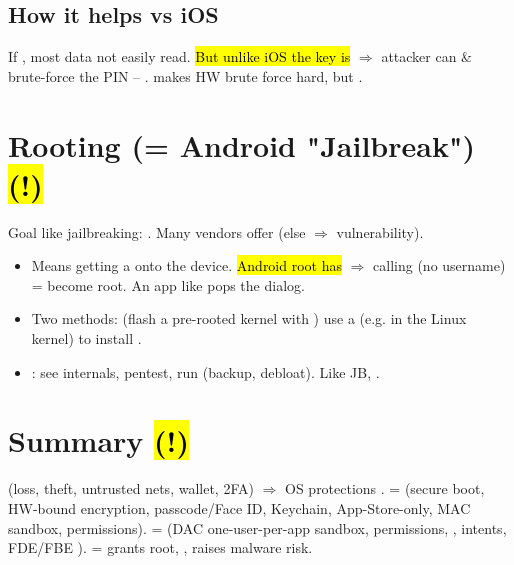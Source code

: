 \subsection{How it helps vs iOS}
If , most data not easily read. \hl{But unlike iOS the key is } $\Rightarrow$ attacker can  \& brute-force the PIN  -- .  makes HW brute force hard, but .

\section{Rooting (= Android "Jailbreak") \hl{(!)}}
Goal like jailbreaking: . Many vendors offer  (else $\Rightarrow$ vulnerability).
\begin{itemize}
\item Means getting a  onto the device. \hl{Android root has } $\Rightarrow$ calling  (no username) = become root. An app like  pops the  dialog.
\item Two methods:  (flash a pre-rooted kernel with )  use a  (e.g. in the Linux kernel) to install .
\item {}: see internals, pentest, run  (backup, debloat). Like JB, .
\end{itemize}

\section{Summary \hl{(!)}}
\begin{defbox}
 (loss, theft, untrusted nets, wallet, 2FA) $\Rightarrow$ OS protections .  =  (secure boot, HW-bound encryption, passcode/Face ID, Keychain, App-Store-only, MAC sandbox, permissions).  =  (DAC one-user-per-app sandbox, permissions, , intents, FDE/FBE ).  = grants root, , raises malware risk.
\end{defbox}

